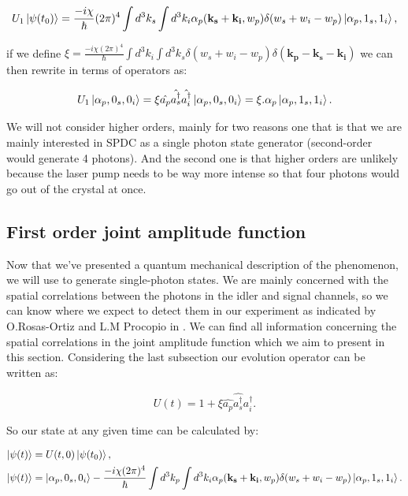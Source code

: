\documentclass[12pt]{article}
\begin{document}
\begin{equation}
U_{1}\ket{\psi(t_{0})}=\frac{-i\chi}{\hbar} (2 \pi)^{4} \int d^{3}k_{s}\int d^{3}k_{i} \alpha_{p}(\mathbf{k_{s}}+\mathbf{k_{i}},w_{p}) \delta(w_{s}+w_{i}-w_{p})\ket{\alpha_{p},1_{s},1_{i}},
\end{equation}

if we define $\xi=\frac{-i\chi(2 \pi)^{4}}{\hbar} \int d^{3}k_{i} \int d^{3}k_{s}\delta(w_{s}+w_{i}-w_{p}) \delta(\mathbf{k_{p}}-\mathbf{k_{s}}-\mathbf{k_{i}})$ we can then rewrite in terms of operators as:

\begin{equation}
U_{1}\ket{\alpha_{p},0_{s},0_{i}}=\xi \hat{a_{p}}\hat{a_{s}^{\dagger}}\hat{a_{i}^{\dagger}}\ket{\alpha_{p},0_{s},0_{i}}=\xi. \alpha_{p} \ket{\alpha_{p},1_{s},1_{i}}.
\end{equation}

We will not consider higher orders, mainly for two reasons one that is that we are mainly interested in SPDC as a single photon state generator (second-order would generate 4 photons). And the second one is that higher orders are unlikely because the laser pump needs to be way more intense so that four photons would go out of the crystal at once.

\subsection{First order joint amplitude function}

Now that we've presented a quantum mechanical description of the phenomenon, we will use to generate single-photon states. We are mainly concerned with the spatial correlations between the photons in the idler and signal channels, so we can know where we expect to detect them in our experiment as indicated by O.Rosas-Ortiz and L.M Procopio in \cite{procopio}. We can find all information concerning the spatial correlations in the joint amplitude function which we aim to present in this section. Considering the last subsection our evolution operator can be written as:

\begin{equation}
U(t)=1+\xi \hat{a_{p}}\hat{a_{s}^{\dagger}}\hat{a_{i}^{\dagger}}.
\end{equation}

So our state at any given time can be calculated by:

\begin{align}
\ket{\psi(t)}&=U(t,0)\ket{\psi(t_{0})},\\
\ket{\psi(t)}&=\ket{\alpha_{p},0_{s},0_{i}}-\frac{-i \chi (2 \pi)^{4}}{\hbar} \int d^{3}k_{p} \int d^{3}k_{i} \alpha_{p}(\mathbf{k_{s}}+\mathbf{k_{i}},w_{p}) \delta(w_{s}+w_{i}-w_{p})\ket{\alpha_{p},1_{s},1_{i}}.
\end{align}
\end{document}
